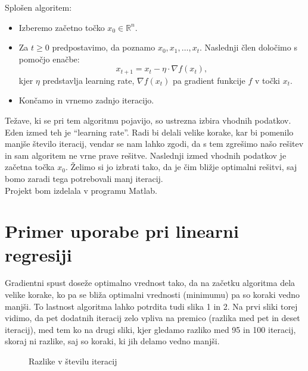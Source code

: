 \documentclass{article}
\begin{document}
Splošen algoritem:
\begin{itemize}
\item{Izberemo začetno točko $x_0 \in \mathbb{R}^n $. }
\item{Za $t \geq 0$ predpostavimo, da poznamo $x_0,x_1, \ldots ,x_t $. Naslednji člen določimo s pomočjo enačbe: 
\[ x_{t+1}=x_t - \eta \cdot \nabla f(x_t), \] 
kjer $ \eta$ predstavlja learning rate, $\nabla f(x_t) $ pa gradient funkcije $f$ v točki $x_t$.}
\item{Končamo in vrnemo zadnjo iteracijo.}
\end{itemize}

Težave, ki se pri tem algoritmu pojavijo, so ustrezna izbira vhodnih podatkov. Eden izmed teh je ``learning rate''. Radi bi delali velike korake, kar bi pomenilo manjše število iteracij, vendar se nam lahko zgodi, da s tem zgrešimo našo rešitev in sam algoritem ne vrne prave rešitve. Naslednji izmed vhodnih podatkov je začetna točka $x_0$. Želimo si jo izbrati tako, da je čim bližje optimalni rešitvi, saj bomo zaradi tega potrebovali manj iteracij.\\

Projekt bom izdelala v programu Matlab.


\section{Primer uporabe pri linearni regresiji}
Gradientni spust doseže optimalno vrednost tako, da na začetku algoritma dela velike korake, ko pa se bliža optimalni vrednosti (minimumu) pa so koraki vedno manjši. To lastnost algoritma lahko potrdita tudi slika 1 in 2. Na prvi sliki torej vidimo, da pet dodatnih iteracij zelo vpliva na premico (razlika med pet in deset iteracij), med tem ko na drugi sliki, kjer gledamo razliko med 95 in 100 iteracij, skoraj ni razlike, saj so koraki, ki jih delamo vedno manjši. \\



\begin{figure}[h]
    \centering
    \caption{Razlike v številu iteracij}
    \label{fig:foobar}
\end{figure}
\end{document}
